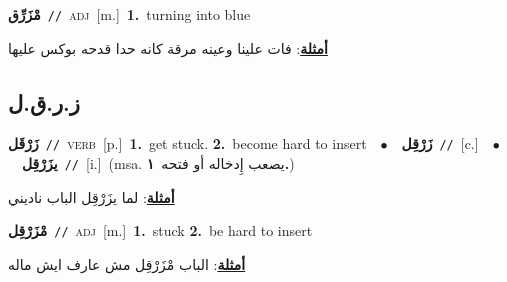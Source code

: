 \documentclass[10pt,a4paper,twoside]{article} %
\begin{document}
\begin{multicols}{2}
{\setlength\topsep{0pt}\textbf{\foreignlanguage{arabic}{مْزَرِّق}}\ {\color{gray}\texttt{//}\color{black}}\ \textsc{adj}\ [m.]\ \textbf{1.}~turning into blue\  \begin{flushright}\color{gray}\foreignlanguage{arabic}{\textbf{\underline{\foreignlanguage{arabic}{أمثلة}}}: فات علينا وعينه مرقة كانه حدا قدحه بوكس عليها}\end{flushright}\color{black}} \vspace{2mm}

\vspace{-3mm}
\subsection*{\color{blue}\foreignlanguage{arabic}{ز.ر.ق.ل}\color{blue}{}} 

{\setlength\topsep{0pt}\textbf{\foreignlanguage{arabic}{زَرْقَل}}\ {\color{gray}\texttt{//}\color{black}}\ \textsc{verb}\ [p.]\ \textbf{1.}~get stuck.  \textbf{2.}~become hard to insert\ \ $\bullet$\ \ \setlength\topsep{0pt}\textbf{\foreignlanguage{arabic}{زَرْقِل}}\ {\color{gray}\texttt{//}\color{black}}\ [c.]\ \ $\bullet$\ \ \setlength\topsep{0pt}\textbf{\foreignlanguage{arabic}{يزَرْقِل}}\ {\color{gray}\texttt{//}\color{black}}\ [i.]\ \color{gray}(msa. \foreignlanguage{arabic}{يصعب إِدخاله أو فتحه}~\foreignlanguage{arabic}{\textbf{١.}})\color{black}\  \begin{flushright}\color{gray}\foreignlanguage{arabic}{\textbf{\underline{\foreignlanguage{arabic}{أمثلة}}}: لما يزَرْقِل الباب ناديني}\end{flushright}\color{black}} \vspace{2mm}

{\setlength\topsep{0pt}\textbf{\foreignlanguage{arabic}{مْزَرْقِل}}\ {\color{gray}\texttt{//}\color{black}}\ \textsc{adj}\ [m.]\ \textbf{1.}~stuck  \textbf{2.}~be hard to insert\  \begin{flushright}\color{gray}\foreignlanguage{arabic}{\textbf{\underline{\foreignlanguage{arabic}{أمثلة}}}: الباب مْزَرْقِل مش عارف ايش ماله}\end{flushright}\color{black}} \vspace{2mm}


\end{multicols}
\end{document}

